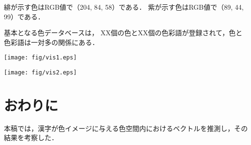 \documentclass[a4j,twocolumn]{ujarticle} %
\newcommand{\colorname}{色彩語}
\begin{document}
緋が示す色はRGB値で（204, 84, 58）である．
紫が示す色はRGB値で（89, 44, 99）である．


基本となる色データベースは，
XX個の色とXX個の\colorname{}が登録されて，色と\colorname{}は一対多の関係にある．

\begin{center}
  \texttt{[image: fig/vis1.eps]}
\end{center}

\begin{center}
  \texttt{[image: fig/vis2.eps]}
\end{center}

\section{おわりに}

本稿では，漢字が色イメージに与える色空間内におけるベクトルを推測し，その結果を考察した．




\end{document}
